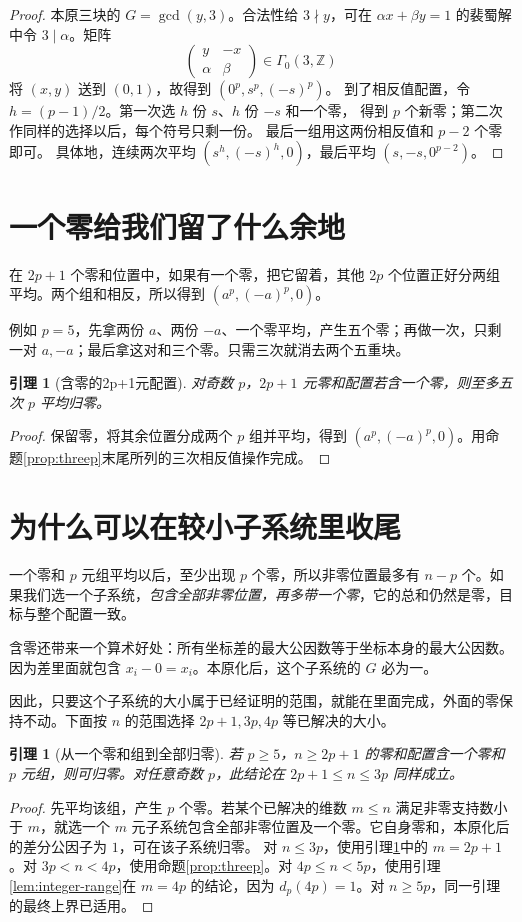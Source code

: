 \documentclass[11pt,a4paper,oneside,openany]{book}
\newcommand{\Z}{\mathbb Z}
\newtheorem{lemma}[theorem]{引理}
\theoremstyle{definition}
\numberwithin{equation}{chapter}
\begin{document}
\begin{proof}
本原三块的 $G=\gcd(y,3)$。合法性给 $3\nmid y$，可在 $\alpha x+\beta y=1$ 的裴蜀解中令 $3\mid\alpha$。矩阵
\[
\begin{pmatrix}y&-x\\\alpha&\beta\end{pmatrix}\in\Gamma_0(3,\Z)
\]
将 $(x,y)$ 送到 $(0,1)$，故得到 $(0^p,s^p,(-s)^p)$。
到了相反值配置，令 $h=(p-1)/2$。第一次选 $h$ 份 $s$、$h$ 份 $-s$ 和一个零，
得到 $p$ 个新零；第二次作同样的选择以后，每个符号只剩一份。
最后一组用这两份相反值和 $p-2$ 个零即可。
具体地，连续两次平均 $(s^h,(-s)^h,0)$，最后平均 $(s,-s,0^{p-2})$。
\end{proof}

\section{一个零给我们留了什么余地}
在 $2p+1$ 个零和位置中，如果有一个零，把它留着，其他 $2p$ 个位置正好分两组平均。两个组和相反，所以得到 $(a^p,(-a)^p,0)$。

例如 $p=5$，先拿两份 $a$、两份 $-a$、一个零平均，产生五个零；再做一次，只剩一对 $a,-a$；最后拿这对和三个零。只需三次就消去两个五重块。
\begin{lemma}[含零的2p+1元配置]\label{lem:zero-base}
对奇数 $p$，$2p+1$ 元零和配置若含一个零，则至多五次 $p$ 平均归零。
\end{lemma}
\begin{proof}
保留零，将其余位置分成两个 $p$ 组并平均，得到 $(a^p,(-a)^p,0)$。用命题\ref{prop:threep}末尾所列的三次相反值操作完成。
\end{proof}

\section{为什么可以在较小子系统里收尾}
一个零和 $p$ 元组平均以后，至少出现 $p$ 个零，所以非零位置最多有 $n-p$ 个。如果我们选一个子系统，\emph{包含全部非零位置，再多带一个零}，它的总和仍然是零，目标与整个配置一致。

含零还带来一个算术好处：所有坐标差的最大公因数等于坐标本身的最大公因数。因为差里面就包含 $x_i-0=x_i$。本原化后，这个子系统的 $G$ 必为一。

因此，只要这个子系统的大小属于已经证明的范围，就能在里面完成，外面的零保持不动。下面按 $n$ 的范围选择 $2p+1,3p,4p$ 等已解决的大小。
\begin{lemma}[从一个零和组到全部归零]\label{lem:zero-tail}
若 $p\ge5$，$n\ge2p+1$ 的零和配置含一个零和 $p$ 元组，则可归零。对任意奇数 $p$，此结论在 $2p+1\le n\le3p$ 同样成立。
\end{lemma}
\begin{proof}
先平均该组，产生 $p$ 个零。若某个已解决的维数 $m\le n$ 满足非零支持数小于 $m$，就选一个 $m$ 元子系统包含全部非零位置及一个零。它自身零和，本原化后的差分公因子为 $1$，可在该子系统归零。
对 $n\le3p$，使用引理\ref{lem:zero-base}中的 $m=2p+1$。对 $3p<n<4p$，使用命题\ref{prop:threep}。对 $4p\le n<5p$，使用引理\ref{lem:integer-range}在 $m=4p$ 的结论，因为 $d_p(4p)=1$。对 $n\ge5p$，同一引理的最终上界已适用。
\end{proof}
\end{document}
